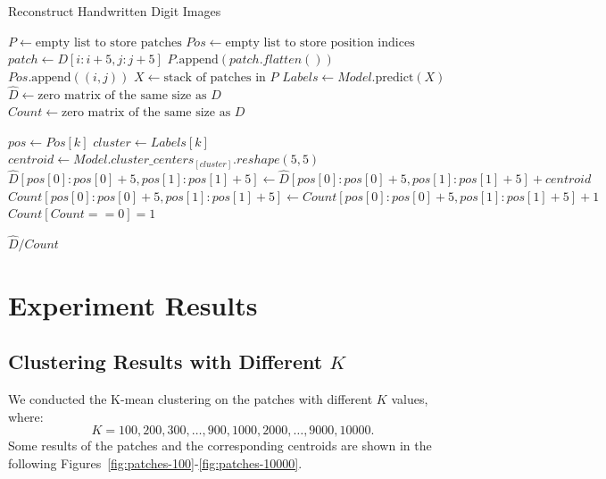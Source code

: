 \documentclass{article}
\begin{document}
\begin{algorithm}
\caption{Reconstruct Handwritten Digit Images}\label{alg:reconstruct}
\begin{algorithmic}[1]
    \State $P \gets \text{empty list to store patches}$
    \State $Pos \gets \text{empty list to store position indices}$
     
            \State $patch \gets D[i:i+5, j:j+5]$
                \State $P.\text{append}(patch.flatten())$
                \State $Pos.\text{append}((i, j))$
            \EndIf
        \EndFor
    \EndFor
    \State $X \gets \text{stack of patches in } P$
    \State $Labels \gets Model.\text{predict}(X)$ 
    \State $\hat{D} \gets \text{zero matrix of the same size as } D$ 
    \State $Count \gets \text{zero matrix of the same size as } D$ 

        \State $pos \gets Pos[k]$
        \State $cluster \gets Labels[k]$
        \State $centroid \gets Model.cluster\_centers_[cluster].reshape(5, 5)$
        \State $\hat{D}[pos[0]:pos[0]+5, pos[1]:pos[1]+5] \gets \hat{D}[pos[0]:pos[0]+5, pos[1]:pos[1]+5] + centroid$
        \State $Count[pos[0]:pos[0]+5, pos[1]:pos[1]+5] \gets Count[pos[0]:pos[0]+5, pos[1]:pos[1]+5]+1$
    \EndFor
    \State $Count[Count == 0] = 1$  

    \State \Return $\hat{D}/Count$
\EndProcedure
\end{algorithmic}
\end{algorithm}



\section{Experiment Results}\label{sec:experiment}

\subsection{Clustering Results with Different $K$}
We conducted the K-mean clustering on the patches with different $K$ values, where:
\[K = 100, 200, 300, \dots, 900, 1000, 2000, \dots, 9000, 10000. \]
Some results of the patches and the corresponding centroids are shown in the following Figures~\ref{fig:patches-100}-\ref{fig:patches-10000}.
\end{document}
